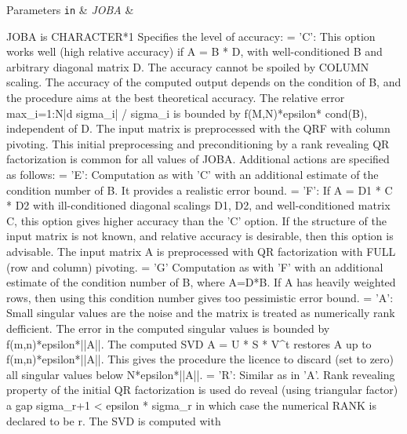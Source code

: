 \begin{DoxyParams}[1]{Parameters}
\mbox{\tt in}  & {\em J\+O\+B\+A} & \begin{DoxyVerb}          JOBA is CHARACTER*1
         Specifies the level of accuracy:
       = 'C': This option works well (high relative accuracy) if A = B * D,
              with well-conditioned B and arbitrary diagonal matrix D.
              The accuracy cannot be spoiled by COLUMN scaling. The
              accuracy of the computed output depends on the condition of
              B, and the procedure aims at the best theoretical accuracy.
              The relative error max_{i=1:N}|d sigma_i| / sigma_i is
              bounded by f(M,N)*epsilon* cond(B), independent of D.
              The input matrix is preprocessed with the QRF with column
              pivoting. This initial preprocessing and preconditioning by
              a rank revealing QR factorization is common for all values of
              JOBA. Additional actions are specified as follows:
       = 'E': Computation as with 'C' with an additional estimate of the
              condition number of B. It provides a realistic error bound.
       = 'F': If A = D1 * C * D2 with ill-conditioned diagonal scalings
              D1, D2, and well-conditioned matrix C, this option gives
              higher accuracy than the 'C' option. If the structure of the
              input matrix is not known, and relative accuracy is
              desirable, then this option is advisable. The input matrix A
              is preprocessed with QR factorization with FULL (row and
              column) pivoting.
       = 'G'  Computation as with 'F' with an additional estimate of the
              condition number of B, where A=D*B. If A has heavily weighted
              rows, then using this condition number gives too pessimistic
              error bound.
       = 'A': Small singular values are the noise and the matrix is treated
              as numerically rank defficient. The error in the computed
              singular values is bounded by f(m,n)*epsilon*||A||.
              The computed SVD A = U * S * V^t restores A up to
              f(m,n)*epsilon*||A||.
              This gives the procedure the licence to discard (set to zero)
              all singular values below N*epsilon*||A||.
       = 'R': Similar as in 'A'. Rank revealing property of the initial
              QR factorization is used do reveal (using triangular factor)
              a gap sigma_{r+1} < epsilon * sigma_r in which case the
              numerical RANK is declared to be r. The SVD is computed with

\end{DoxyVerb}
\end{DoxyParams}
